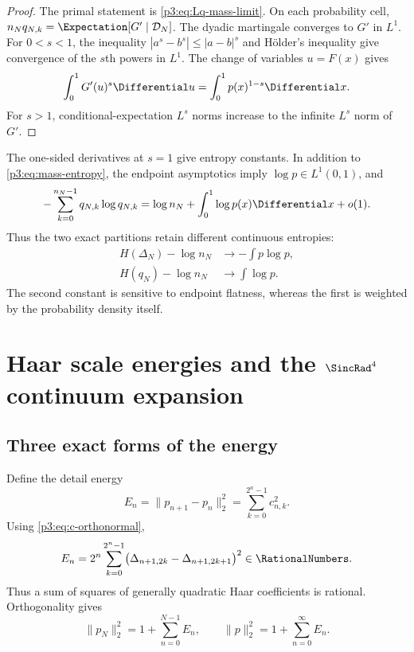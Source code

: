 \documentclass[11pt]{article}
\theoremstyle{definition}
\theoremstyle{remark}
\begin{document}
\begin{proof}
The primal statement is \eqref{p3:eq:Lq-mass-limit}.  On each probability cell,
$n_Nq_{N,k}=\Expectation[G'\mid\mathcal D_N]$.  The dyadic martingale converges to $G'$
in $L^1$.  For $0<s<1$, the inequality
$|a^s-b^s|\le|a-b|^s$ and H\"older's inequality give convergence of the
$s$th powers in $L^1$.  The change of variables $u=F(x)$ gives
\[
 \int_0^1G'(u)^s\Differential u
 =\int_0^1p(x)^{1-s}\Differential x.
\]
For $s>1$, conditional-expectation $L^s$ norms increase to the infinite
$L^s$ norm of $G'$.
\end{proof}

The one-sided derivatives at $s=1$ give entropy constants.  In addition to
\eqref{p3:eq:mass-entropy}, the endpoint asymptotics imply $\log p\in L^1(0,1)$,
and
\begin{equation}\label{p3:eq:quantile-entropy}
 -\sum_{k=0}^{n_N-1}q_{N,k}\log q_{N,k}
 =\log n_N+\int_0^1\log p(x)\Differential x+o(1).
\end{equation}
Thus the two exact partitions retain different continuous entropies:
\begin{align}
 H(\Delta_N)-\log n_N&\longrightarrow-\int p\log p,
 \label{p3:eq:entropy-primal-constant}\\
 H(q_N)-\log n_N&\longrightarrow\int\log p.
 \label{p3:eq:entropy-dual-constant}
\end{align}
The second constant is sensitive to endpoint flatness, whereas the first is
weighted by the probability density itself.

\section[Haar scale energies and the sinc-fourth-power continuum expansion]{Haar scale energies and the $\SincRad^4$ continuum expansion}
\label{p3:sec:haar-energy}

\subsection{Three exact forms of the energy}

Define the detail energy
\begin{equation}\label{p3:eq:En-def}
 E_n=\|p_{n+1}-p_n\|_2^2
 =\sum_{k=0}^{2^n-1}c_{n,k}^2.
\end{equation}
Using \eqref{p3:eq:c-orthonormal},
\begin{equation}\label{p3:eq:En-masses}
 E_n=2^n\sum_{k=0}^{2^n-1}
 \bigl(\Delta_{n+1,2k}-\Delta_{n+1,2k+1}\bigr)^2\in\RationalNumbers.
\end{equation}
Thus a sum of squares of generally quadratic Haar coefficients is rational.
Orthogonality gives
\begin{equation}\label{p3:eq:L2-energy-telescope}
 \|p_N\|_2^2=1+\sum_{n=0}^{N-1}E_n,
 \qquad
 \|p\|_2^2=1+\sum_{n=0}^\infty E_n.
\end{equation}
\end{document}
